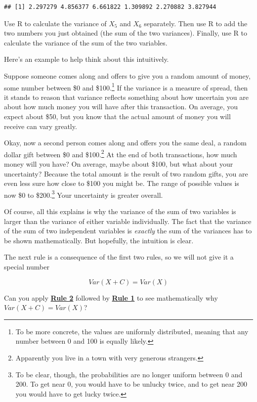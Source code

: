 \documentclass[
]{book}
\begin{document}
\begin{verbatim}
## [1] 2.297279 4.856377 6.661822 1.309892 2.270882 3.827944
\end{verbatim}

Use R to calculate the variance of \(X_{5}\) and \(X_{6}\) separately. Then use R to add the two numbers you just obtained (the sum of the two variances). Finally, use R to calculate the variance of the sum of the two variables.

Here's an example to help think about this intuitively.

Suppose someone comes along and offers to give you a random amount of money, some number between \$0 and \$100.\footnote{To be more concrete, the values are uniformly distributed, meaning that any number between 0 and 100 is equally likely.} If the variance is a measure of spread, then it stands to reason that variance reflects something about how uncertain you are about how much money you will have after this transaction. On average, you expect about \$50, but you know that the actual amount of money you will receive can vary greatly.

Okay, now a second person comes along and offers you the same deal, a random dollar gift between \$0 and \$100.\footnote{Apparently you live in a town with very generous strangers.} At the end of both transactions, how much money will you have? On average, maybe about \$100, but what about your uncertainty? Because the total amount is the result of two random gifts, you are even less sure how close to \$100 you might be. The range of possible values is now \$0 to \$200.\footnote{To be clear, though, the probabilities are no longer uniform between 0 and 200. To get near 0, you would have to be unlucky twice, and to get near 200 you would have to get lucky twice.} Your uncertainty is greater overall.

Of course, all this explains is why the variance of the sum of two variables is larger than the variance of either variable individually. The fact that the variance of the sum of two independent variables is \emph{exactly} the sum of the variances has to be shown mathematically. But hopefully, the intuition is clear.

The next rule is a consequence of the first two rules, so we will not give it a special number

\[
Var\left(X + C\right) = Var\left(X\right)
\]

Can you apply \protect\hyperlink{Rule2}{\textbf{Rule 2}} followed by \protect\hyperlink{Rule1}{\textbf{Rule 1}} to see mathematically why \(Var\left(X + C\right) = Var\left(X\right)\)?
\end{document}

